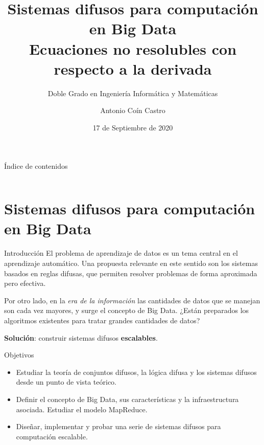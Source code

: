 \documentclass[10pt, spanish]{beamer}
\title{Sistemas difusos para computación en Big Data \\ Ecuaciones no resolubles con respecto a la derivada}
\subtitle{Doble Grado en Ingeniería Informática y Matemáticas}
\date{17 de Septiembre de 2020}
\author{Antonio Coín Castro}
\institute{Trabajo Fin de Grado \\\\\\ \textit{E.T.S de Ingenierías Informática y de Telecomunicación \\ Facultad de Ciencias}}
\begin{document}
\maketitle

\begin{frame}{Índice de contenidos}
  \begin{columns}[t]
    \begin{column}{.5\textwidth}
      \tableofcontents[sections={1}]
    \end{column}
    \begin{column}{.5\textwidth}
      \tableofcontents[sections={2}]
    \end{column}
  \end{columns}
\end{frame}

\section{Sistemas difusos para computación en Big Data}

\begin{frame}{Introducción}
  El problema de aprendizaje de datos es un tema central en el aprendizaje automático. Una propuesta relevante en este sentido son los sistemas basados en reglas difusas, que permiten resolver problemas de forma aproximada pero efectiva.

  Por otro lado, en la \textit{era de la información} las cantidades de datos que se manejan son cada vez mayores, y surge el concepto de Big Data. ¿Están preparados los algoritmos existentes para tratar grandes cantidades de datos?
  \vspace{1em}

  {\color{Maroon}\textbf{Solución}:} construir sistemas difusos \textbf{escalables}.
\end{frame}

\begin{frame}{Objetivos}
\begin{itemize}[<+->]
\item Estudiar la teoría de conjuntos difusos, la lógica difusa y los sistemas difusos desde un punto de vista teórico.
\item Definir el concepto de Big Data, sus características y la infraestructura asociada. Estudiar el modelo MapReduce.
\item Diseñar, implementar y probar una serie de sistemas difusos para computación escalable.
\end{itemize}
\end{frame}
\end{document}
